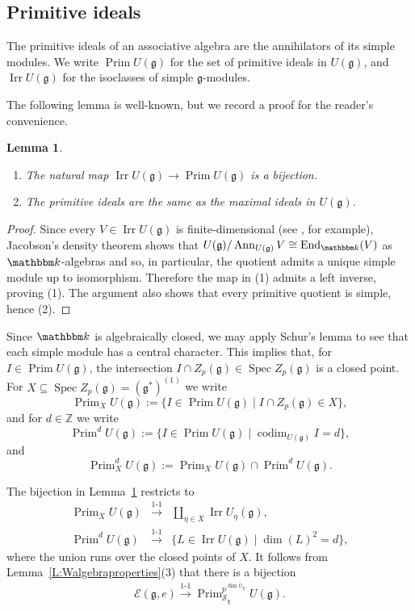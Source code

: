 \documentclass[twoside,12pt,reqno]{amsart}
\newtheorem{Lemma}[Theorem]{Lemma}
\theoremstyle{remark}
\numberwithin{equation}{section}
\def\k{{\mathbbm k}}
\def\Ann{\operatorname{Ann}}
\def\Spec{\operatorname{Spec}}
\def\End{\operatorname{End}}
\def\codim{\operatorname{codim}}
\def\Prim{\operatorname{Prim}}
\def\Irr{\operatorname{Irr}}
\def\Z{{\mathbb Z}}
\def\O{{\mathbb O}}
\def\g{{\mathfrak g}}
\def\E{\mathcal{E}}
\renewcommand{\S}{\mathcal{S}}
\begin{document}
 \subsection{Primitive ideals}
\label{ss:primitiveideals}

The primitive ideals of an associative algebra are the annihilators of its simple modules. We write $\Prim U(\g)$ for the set of primitive ideals in $U(\g)$, and $\Irr U(\g)$ for the isoclasses of simple $\g$-modules.

The following lemma is well-known, but we record a proof for the reader's convenience.
\begin{Lemma}
\label{L:simplesprimitivesmaximals}
\begin{enumerate}
    \item The natural map $\Irr U(\g) \to \Prim U(\g)$ is a bijection.
    \item The primitive ideals are the same as the maximal ideals in $U(\g)$.
\end{enumerate}
\end{Lemma}
\begin{proof}
   Since every $V\in \Irr U(\g)$ is finite-dimensional (see \cite{JaLA}, for example), Jacobson's density theorem shows that $U(\g) / \Ann_{U(\g)} V \cong \End_\k(V)$ as $\k$-algebras and so, in particular, the quotient admits a unique simple module up to isomorphism. Therefore the map in (1) admits a left inverse, proving (1). The argument also shows that every primitive quotient is simple, hence (2).    
\end{proof}
  

Since $\k$ is algebraically closed, we may apply Schur's lemma to see that each simple module has a central character. 
This implies that, for $I \in \Prim U(\g)$, the intersection $I \cap Z_p(\g) \in \Spec Z_p(\g)$ is a  closed point.
For $X \subseteq \Spec Z_p(\g) = (\g^*)^{(1)}$ we write
$$\Prim_X U(\g) := \{ I \in \Prim U(\g) \mid I \cap Z_p(\g) \in X\},$$  and for $d \in \Z$ we write $$\Prim^d U(\g) := \{ I \in \Prim U(\g) \mid \codim_{U(\g)} I = d\},$$ and $$\Prim_X^d U(\g) := \Prim_X U(\g) \cap \Prim^d U(\g).$$

The bijection in Lemma~\ref{L:simplesprimitivesmaximals} restricts to
\begin{eqnarray*}
    \Prim_X U(\g)&\overset{1\text{-}1}{\longrightarrow } &\coprod_{\eta\in X}\Irr U_\eta(\g),\\
    \Prim^d U(\g)&\overset{1\text{-}1}{\longrightarrow } &\{L\in\Irr U(\g)\mid \dim(L)^2=d\},
\end{eqnarray*}
where the union runs over the closed points of $X$. It follows from Lemma~\ref{L:Walgebraproperties}(3) that there is a bijection
\begin{eqnarray}
\label{eq:1dimsandprimitives}
\E(\g,e) \overset{1\text{-}1}{\longrightarrow }\Prim_{\S_\chi}^{p^{\dim \O_\chi}} U(\g).
\end{eqnarray}
\end{document}
